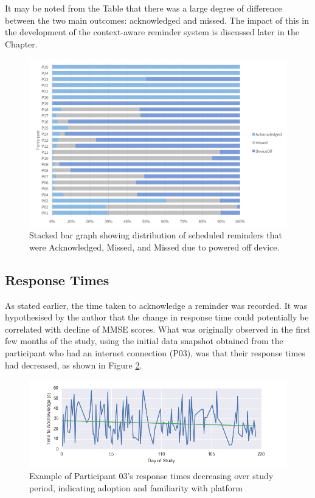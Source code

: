 It may be noted from the Table that there was a large degree of difference between the two main outcomes: acknowledged and missed. The impact of this in the development of the context-aware reminder system is discussed later in the Chapter.

\begin{figure}[h]
    \centering
        \includegraphics[scale=0.6, angle=0]{Files/treatment-study-1/figures/reminder-stacked-stats}
        \caption{Stacked bar graph showing distribution of scheduled reminders that were Acknowledged, Missed, and Missed due to powered off device.}
        \label{fig: reminder-stacked-stats}
\end{figure}

\subsection{Response Times}
As stated earlier, the time taken to acknowledge a reminder was recorded. It was hypothesised by the author that the change in response time could potentially be correlated with decline of MMSE scores. What was originally observed in the first few months of the study, using the initial data snapshot obtained from the participant who had an internet connection (P03), was that their response times had decreased, as shown in Figure \ref{fig: responsetimedecrease}.

\begin{figure}[h]
    \centering
        \includegraphics[scale=0.7, angle=0]{Files/treatment-study-1/figures/responsetimedecrease}
        \caption{Example of Participant 03's response times decreasing over study period, indicating adoption and familiarity with platform}
        \label{fig: responsetimedecrease}
\end{figure}

